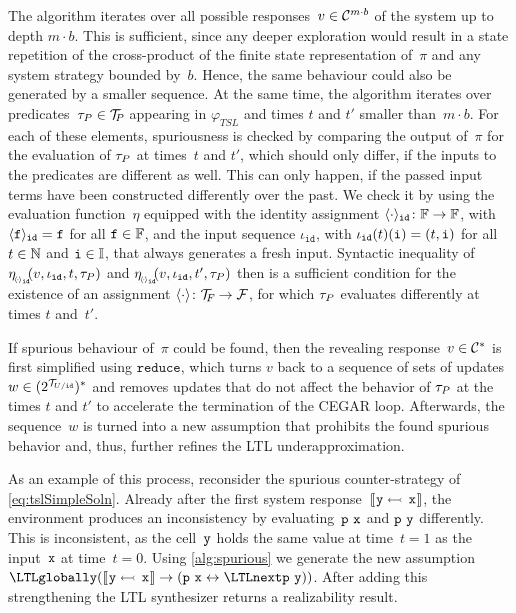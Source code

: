 The algorithm iterates over all possible
responses~$ v \in \mathcal{C}^{m \cdot b} $ of the system up to depth
$ m \cdot b $. This is sufficient, since any deeper exploration would
result in a state repetition of the cross-product of the finite state
representation of~$ \pi $ and any system strategy bounded by~$ b
$. Hence, the same behaviour could also be generated by a smaller
sequence. At the same time, the algorithm iterates over
predicates~$ \tau_{P} \in \mathcal{T}_{\!P\hspace{-0.5pt}} $ appearing in
$ \varphi_{\textit{TSL}} $ and times $ t $ and $ t' $ smaller
than~$ m \cdot b $. For each of these elements, spuriousness is
checked by comparing the output of~$ \pi $ for the evaluation of
$ \tau_{P} $ at times~$ t $ and $ t' $, which should only
differ, if the inputs to the predicates are different as well. This
can only happen, if the passed input terms have been constructed
differently over the past. We check it by using the evaluation
function~$ \eta $ equipped with the identity assignment
$ \langle \cdot \rangle_{\texttt{id}} \colon \mathbb{F} \rightarrow \mathbb{F} $, with
$ \langle {\text{\texttt{f}}} \rangle_{\texttt{id}} = {\text{\texttt{f}}} $ for all
$ {\text{\texttt{f}}} \in \mathbb{F} $, and the input sequence
$ \iota_{\texttt{id}} $, with
$ \iota_{\texttt{id}}(t)({\text{\texttt{i}}}) = (t,{\text{\texttt{i}}}) $ for all
$ t \in \mathbb{N}$ and $ {\text{\texttt{i}}} \in \mathbb{I} $, that always generates a
fresh input. Syntactic inequality of
$ \eta_{_{\!\langle \hspace{-1pt} \cdot \hspace{-1pt} \rangle_{\texttt{id}}\!}}\!(v,\iota_{{\text{\texttt{id}}}},t,\tau_{P}) $ \linebreak and
$ \eta_{_{\!\langle \hspace{-1pt} \cdot \hspace{-1pt} \rangle_{\texttt{id}}\!}}\!(v,\iota_{{\text{\texttt{id}}}},t',\tau_{P}) $ then is a sufficient
condition for the existence of an assignment
$ \langle \cdot \rangle \colon \mathcal{T}_{\!F\hspace{-0.5pt}} \rightarrow \mathcal{F} $, for which $ \tau_{P} $
evaluates differently at times $ t $ and~$ t' $.

If spurious behaviour of~$ \pi $ could be found, then the revealing
response~$ v \in \mathcal{C}^{*} $ is first simplified using
$ \texttt{reduce} $, which turns $ v $ back to a sequence of sets of
updates~$ w \in (2^{\mathcal{T}_{\hspace{-0.5pt}U / {\text{\texttt{id}}}}})^{*} $ and removes updates that do not
affect the behavior of $ \tau_{P} $ at the times $ t $ and $ t' $ to
accelerate the termination of the CEGAR loop. Afterwards, the
sequence~$ w $ is turned into a new assumption that prohibits the found
spurious behavior and, thus, further refines the LTL
underapproximation.

As an example of this process, reconsider the spurious
counter-strategy of \cref{eq:tslSimpleSoln}. Already after the first
system response~$ \llbracket \hspace{0.5pt} {\text{\texttt{y}}} \leftarrowtail \, {\text{\texttt{x}}} \hspace{0.5pt} \rrbracket $, the environment produces
an inconsistency by evaluating~$ {\text{\texttt{p}}} \ {\text{\texttt{x}}} $ and
$ {\text{\texttt{p}}} \ {\text{\texttt{y}}} $ differently. This is inconsistent, as the
cell~$ {\text{\texttt{y}}} $ holds the same value at time~$ t = 1 $ as the
input~$ {\text{\texttt{x}}} $ at time~$ t = 0 $. Using \cref{alg:spurious} we generate
the new
assumption~$ \LTLglobally (\upd{\name{y}}{\name{x}} \impl (\name{p} \
\name{x} \leftrightarrow \LTLnext \name{p} \ \name{y})) $. After adding this
strengthening the LTL synthesizer returns a realizability result.

